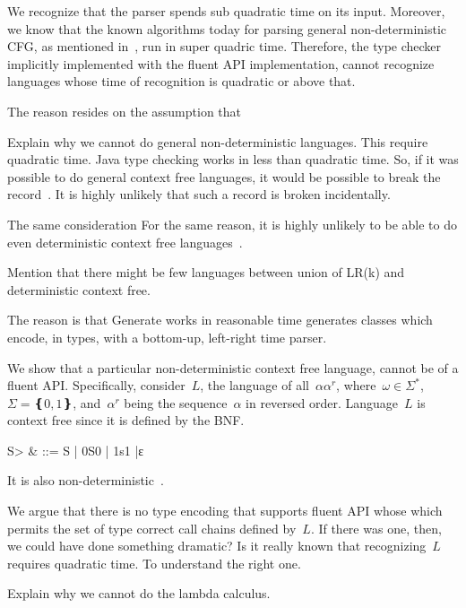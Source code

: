We recognize that the \Java parser spends sub quadratic time
  on its input.
Moreover, we know that the known algorithms today for parsing general 
  non-deterministic CFG, as mentioned in~, run in 
  super quadric time.
Therefore,
  the type checker implicitly implemented with the fluent API implementation,
  cannot recognize languages whose time of recognition is quadratic or above that.

The reason resides on the assumption that

Explain why we cannot do general non-deterministic languages. This require quadratic time.
Java type checking works in less than quadratic time. So, if it was possible to
do general context free languages, it would be possible to
  break the record~\cite{cubic time algorithms}.
It is highly unlikely that such a record is broken incidentally.

The same consideration
For the same reason, it is highly unlikely to be able to do even deterministic
context free languages~\cite{http://www.sciencedirect.com/science/article/pii/S0019995868910875}.

   Mention that there might be few languages between union of LR(k) and deterministic context free.

The reason is that Generate works in reasonable time \Self generates classes which encode, in types, with a bottom-up, left-right time parser.

We show that a particular non-deterministic context free language,
cannot be of a fluent API\@.
Specifically, consider~$L$, the language of all~$αα^r$, where~$\omega∈Σ^*$,~$Σ=❴0,1❵$,
and~$α^r$ being the sequence~$α$ in reversed order.
Language~$L$ is context free since it is defined by the BNF.
\begin{Grammar}
  \begin{aligned}
    \<S> & ::= S | 0S0 | 1s1 |ε
  \end{aligned}
\end{Grammar}
It is also non-deterministic~\cite{Hopcroft:2001}.

We argue that there is no type encoding that supports fluent API whose
  which permits the set of type correct call chains defined by~$L$.
If there was one, then, we could have done something dramatic?
Is it really known that recognizing~$L$ requires quadratic
  time.
To understand
 the right one.

Explain why we cannot do the lambda calculus.
